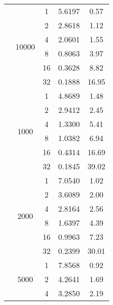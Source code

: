 \begin{tabularx}{\textwidth}{@{} c c c c c @{}}
                            \cmidrule{2-5}
                            & \multirow{6}{*}{10000} & 1  & 5.6197 & 0.57  \\
                            &                        & 2  & 2.8618 & 1.12  \\
                            &                        & 4  & 2.0601 & 1.55  \\
                            &                        & 8  & 0.8063 & 3.97  \\
                            &                        & 16 & 0.3628 & 8.82  \\
                            &                        & 32 & 0.1888 & 16.95 \\
\midrule\enlargethispage{-\baselineskip}
    \multirow{24}{*}{30000} & \multirow{6}{*}{1000} & 1  & 4.8689 & 1.48  \\
                            &                       & 2  & 2.9412 & 2.45  \\
                            &                       & 4  & 1.3300 & 5.41  \\
                            &                       & 8  & 1.0382 & 6.94  \\
                            &                       & 16 & 0.4314 & 16.69 \\
                            &                       & 32 & 0.1845 & 39.02 \\
                            \cmidrule{2-5}
                            & \multirow{6}{*}{2000} & 1  & 7.0540 & 1.02  \\
                            &                       & 2  & 3.6089 & 2.00  \\
                            &                       & 4  & 2.8164 & 2.56  \\
                            &                       & 8  & 1.6397 & 4.39  \\
                            &                       & 16 & 0.9963 & 7.23  \\
                            &                       & 32 & 0.2399 & 30.01 \\
                            \cmidrule{2-5}
                            & \multirow{6}{*}{5000} & 1  & 7.8568 & 0.92  \\
                            &                       & 2  & 4.2641 & 1.69  \\
                            &                       & 4  & 3.2850 & 2.19  \\

\end{tabularx}
